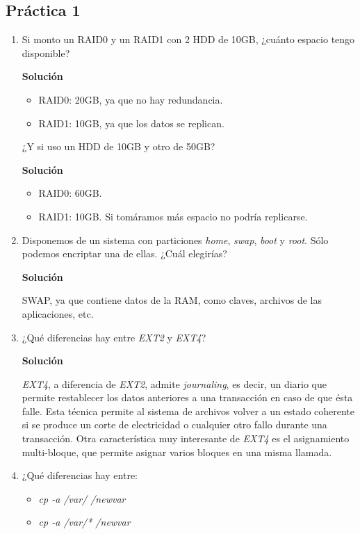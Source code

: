 \documentclass[12pt,spanish]{article}
\newenvironment{solution}{
	\par
	\textbf{Solución}
	\par
	\begin{center}
}
{
	\end{center}
}
\begin{document}
\subsection{Práctica 1}
\begin{enumerate}
  \item Si monto un RAID0 y un RAID1 con 2 HDD de 10GB, ¿cuánto espacio tengo disponible?
  \begin{solution}
    \begin{itemize}
      \item RAID0: 20GB, ya que no hay redundancia.
      \item RAID1: 10GB, ya que los datos se replican.
    \end{itemize}
  \end{solution}
  ¿Y si uso un HDD de 10GB y otro de 50GB?
  \begin{solution}
    \begin{itemize}
      \item RAID0: 60GB.
      \item RAID1: 10GB. Si tomáramos más espacio no podría replicarse.
    \end{itemize}
  \end{solution}
  \item Disponemos de un sistema con particiones \textit{home}, \textit{swap}, \textit{boot} y \textit{root}. Sólo podemos encriptar una de ellas. ¿Cuál elegirías?
  \begin{solution}
    SWAP, ya que contiene datos de la RAM, como claves, archivos de las aplicaciones, etc.
  \end{solution}
	\item ¿Qué diferencias hay entre \textit{EXT2} y \textit{EXT4}?
	\begin{solution}
		\textit{EXT4}, a diferencia de \textit{EXT2}, admite \textit{journaling}, es decir, un diario que permite restablecer los datos anteriores a una transacción en caso de que ésta falle. Esta técnica permite al sistema de archivos volver a un estado coherente si se produce un corte de electricidad o cualquier otro fallo durante una transacción. Otra característica muy interesante de \textit{EXT4} es el asignamiento multi-bloque, que permite asignar varios bloques en una misma llamada.
	\end{solution}
	\item ¿Qué diferencias hay entre:
	\begin{itemize}
		\item \textit{cp -a /var/ /newvar}
		\item \textit{cp -a /var/* /newvar}

\end{itemize}
\end{enumerate}
\end{document}
